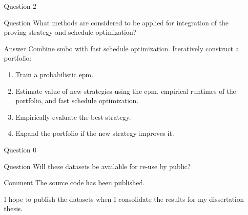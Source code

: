 \begin{frame}{Question 2}
\begin{block}{Question}
What methods are considered to be applied for integration of the proving strategy and schedule optimization?
\end{block}
\begin{exampleblock}{Answer}
Combine \gls{smbo} with fast schedule optimization. Iteratively construct a portfolio:
\begin{enumerate}
\item Train a probabilistic \gls{epm}.
\item Estimate value of new strategies using the \gls{epm},
empirical runtimes of the portfolio, and
fast schedule optimization.
\item Empirically evaluate the best strategy.
\item Expand the portfolio if the new strategy improves it.
\end{enumerate}
\end{exampleblock}
\end{frame}
\begin{frame}{Question 0}
\begin{block}{Question}
Will these datasets be available for re-use by public?
\end{block}
\begin{exampleblock}{Comment}
The source code has been published.

I hope to publish the datasets when I consolidate the results for my dissertation thesis.
\end{exampleblock}
\end{frame}
